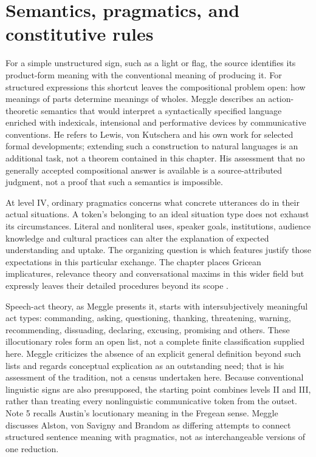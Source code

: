 \section{Semantics, pragmatics, and constitutive rules}

For a simple unstructured sign, such as a light or flag, the source
identifies its product-form meaning with the conventional meaning of
producing it. For structured expressions this shortcut leaves the
compositional problem open: how meanings of parts determine meanings
of wholes. Meggle describes an action-theoretic semantics that would
interpret a syntactically specified language enriched with indexicals,
intensional and performative devices by communicative conventions.
He refers to Lewis, von Kutschera and his own work for selected formal
developments; extending such a construction to natural languages is an
additional task, not a theorem contained in this chapter. His assessment
that no generally accepted compositional answer is available is a
source-attributed judgment, not a proof that such a semantics is impossible.

At level IV, ordinary pragmatics concerns what concrete utterances do
in their actual situations. A token's belonging to an ideal situation
type does not exhaust its circumstances. Literal and nonliteral uses,
speaker goals, institutions, audience knowledge and cultural practices
can alter the explanation of expected understanding and uptake. The
organizing question is which features justify those expectations in this
particular exchange. The chapter places Gricean implicatures, relevance
theory and conversational maxims in this wider field but expressly leaves
their detailed procedures beyond its scope
\cite[pp.~604--605]{Meggle2021RationalityCommunication}.

Speech-act theory, as Meggle presents it, starts with intersubjectively
meaningful act types: commanding, asking, questioning, thanking,
threatening, warning, recommending, dissuading, declaring, excusing,
promising and others. These illocutionary roles
form an open list, not a complete finite classification supplied here.
Meggle criticizes the absence of an explicit general definition beyond
such lists and regards conceptual explication as an outstanding need;
that is his assessment of the tradition, not a census undertaken here.
Because conventional linguistic signs are also presupposed, the starting
point combines levels II and III, rather than treating every nonlinguistic
communicative token from the outset. Note 5 recalls Austin's locutionary
meaning in the Fregean sense. Meggle discusses Alston, von Savigny and
Brandom as differing attempts to connect structured sentence meaning
with pragmatics, not as interchangeable versions of one reduction.

